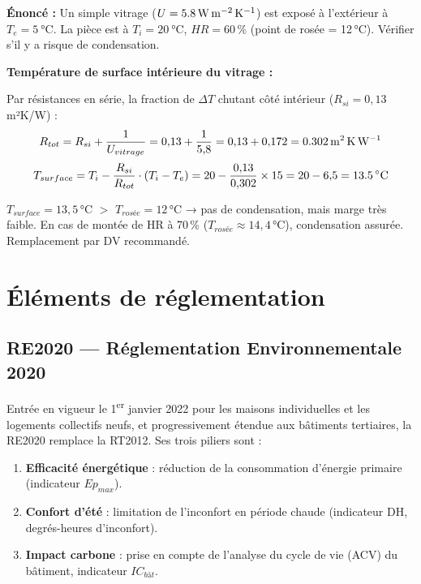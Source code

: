 \begin{exemple}[title=Vérification du risque de condensation superficielle]

\textbf{Énoncé :} Un simple vitrage ($U = \SI{5{,}8}{\watt\per\meter\squared\per\kelvin}$) est exposé à l'extérieur à $T_e = \SI{5}{\degreeCelsius}$. La pièce est à $T_i = \SI{20}{\degreeCelsius}$, $HR = 60\,\%$ (point de rosée = 12\,°C). Vérifier s'il y a risque de condensation.

\textbf{Température de surface intérieure du vitrage :}

Par résistances en série, la fraction de $\Delta T$ chutant côté intérieur ($R_{si} = 0{,}13$\,m²K/W) :
\[
  R_{tot} = R_{si} + \frac{1}{U_{vitrage}} = 0{,}13 + \frac{1}{5{,}8} = 0{,}13 + 0{,}172 = \SI{0{,}302}{\meter\squared\kelvin\per\watt}
\]
\[
  T_{surface} = T_i - \frac{R_{si}}{R_{tot}} \cdot (T_i - T_e) = 20 - \frac{0{,}13}{0{,}302} \times 15 = 20 - 6{,}5 = \SI{13{,}5}{\celsius}
\]

$T_{surface} = 13{,}5$\,°C $>$ $T_{rosée} = 12$\,°C → pas de condensation, mais marge très faible. En cas de montée de HR à 70\,\% ($T_{rosée} \approx 14{,}4$\,°C), condensation assurée. Remplacement par DV recommandé.
\end{exemple}

\section{Éléments de réglementation}

\subsection{RE2020 — Réglementation Environnementale 2020}

Entrée en vigueur le 1\textsuperscript{er} janvier 2022 pour les maisons individuelles et les
logements collectifs neufs, et progressivement étendue aux bâtiments tertiaires, la RE2020
remplace la RT2012. Ses trois piliers sont :
\begin{enumerate}
  \item \textbf{Efficacité énergétique} : réduction de la consommation d'énergie primaire
        (indicateur \(Ep_{max}\)).
  \item \textbf{Confort d'été} : limitation de l'inconfort en période chaude (indicateur DH,
        degrés-heures d'inconfort).
  \item \textbf{Impact carbone} : prise en compte de l'analyse du cycle de vie (ACV) du
        bâtiment, indicateur \(IC_{bât}\).
\end{enumerate}

